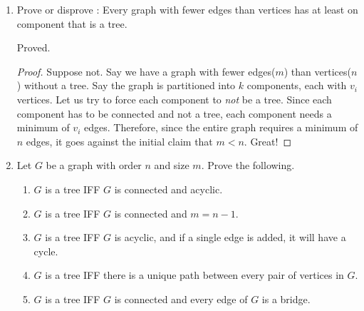 \begin{enumerate}[leftmargin=*]
\begin{enumerate}
    \begin{solution}
        Since there is no connected clause, we cannot call this graph itself a tree. However, if we split the forest into individual components, each are a \textbf{connected, acyclic graph}. Therefore, it is a \textbf{cluster of tress}, a forest. 
    \end{solution}
    \item If a forest has order $n$ and $k$ components, how many edges does it have? 
    \begin{solution}
        $n-k$
    \end{solution}
    \begin{proof}
        Let the forest be split into $k$ trees. Let each tree have $v_i$ verticies. By the alternate definition of the tree, each tree has $v_i-1$ edges. If we sum this up, we get
        $$ \sum_{i=1}^k v_i-1 = \sum_{i=1}^k v_i - \sum_{i=1}^k 1 = n - k $$
    \end{proof} \color{red} Great! \color{black}
\end{enumerate}
\item Prove or disprove : Every graph with fewer edges than vertices has at least on component that is a tree. 
\begin{solution}
    Proved. 
\end{solution}
\begin{proof}
    Suppose not. Say we have a graph with fewer edges($m$) than vertices($n$) without a tree. Say the graph is partitioned into $k$ components, each with $v_i$ vertices. Let us try to force each component to \textit{not} be a tree. Since each component has to be connected and not a tree, each component needs a minimum of $v_i$ edges. Therefore, since the entire graph requires a minimum of $n$ edges, it goes against the initial claim that $m < n$. \color{red} Great! \color{black}
\end{proof}
\item Let $G$ be a graph with order $n$ and size $m$. Prove the following. 
\begin{enumerate}
    \item $G$ is a tree IFF $G$ is connected and acyclic. 
    \item $G$ is a tree IFF $G$ is connected and $m=n-1$. 
    \item $G$ is a tree IFF $G$ is acyclic, and if a single edge is added, it will have a cycle. 
    \item $G$ is a tree IFF there is a unique path between every pair of vertices in $G$. 
    \item $G$ is a tree IFF $G$ is connected and every edge of $G$ is a bridge. 

\end{enumerate}
\end{enumerate}
